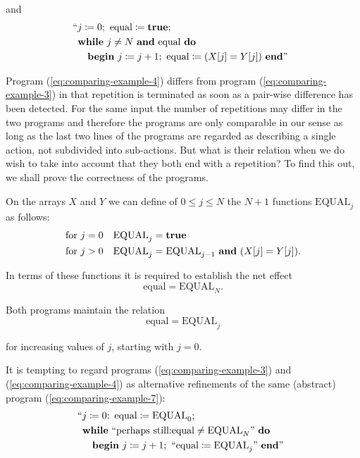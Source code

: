 \noindent
and
\begin{equation}
	\label{eq:comparing-example-4}
	\begin{split}
		&\text{\hspace{-.5em}``}j \coloneq 0;\text{ equal} \coloneq \text{\textbf{true}};\\
		&\text{\textbf{while} } j \neq N\text{ \textbf{and} equal \textbf{do}}\\
		&\quad\text{\textbf{begin} } j \coloneq  j + 1;\text{ equal} \coloneq (X[j] = Y[j]) \text{ \textbf{end}''}
	\end{split}
\end{equation}

Program (\ref{eq:comparing-example-4}) differs from program (\ref{eq:comparing-example-3}) in that repetition is terminated as soon as a pair-wise difference has been detected. For the same input the number of repetitions may differ in the two programs and therefore the programs are only comparable in our sense as long as the last two lines of the programs are regarded as describing a single action, not subdivided into sub-actions. But what is their relation when we do wish to take into account that they both end with a repetition? To find this out, we shall prove the correctness of the programs.

On the arrays $X$ and $Y$ we can define of $0 \leqslant j \leqslant N$ the $N + 1$ functions $\text{EQUAL}_j$ as follows:
\begin{equation}
	\label{eq:comparing-example-5}
	\begin{split}
		\text{for } j = 0\quad & \text{EQUAL}_j = \text{\textbf{true}} \\
		\text{for } j > 0\quad  & \text{EQUAL}_j = \text{EQUAL}_{j-1}\text{ \textbf{and} } (X[j] = Y[j]).
	\end{split}
\end{equation}

In terms of these functions it is required to establish the net effect
$$
\text{equal} = \text{EQUAL}_N.
$$

Both programs maintain the relation
\begin{equation}
	\text{equal} = \text{EQUAL}_j
\end{equation}

\noindent
for increasing values of $j$, starting with $j = 0$.

It is tempting to regard programs (\ref{eq:comparing-example-3}) and (\ref{eq:comparing-example-4}) as alternative refinements of the same (abstract) program (\ref{eq:comparing-example-7}):
\begin{equation}
	\label{eq:comparing-example-7}
	\begin{split}
		&\text{\hspace{-.5em}``}j \coloneq 0;\text{ equal} \coloneq \text{EQUAL}_0;\\
		&\text{\textbf{while} ``perhaps still:equal} \neq \text{EQUAL}_N\text{'' \textbf{do}}\\
		&\quad\text{\textbf{begin} } j \coloneq  j + 1;\text{ ``equal} \coloneq \text{EQUAL}_j\text{'' \textbf{end}''}
	\end{split}
\end{equation}

